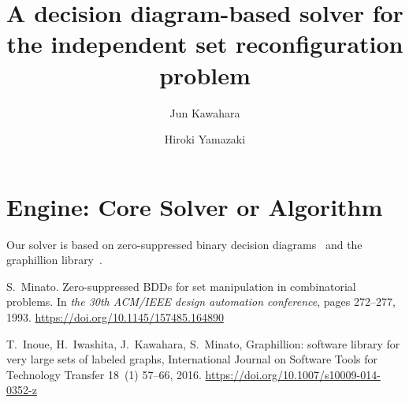 \documentclass{article}
\date{}
\title{A decision diagram-based solver for the independent set reconfiguration problem}
\author[1]{Jun Kawahara}
\author[1]{Hiroki Yamazaki}
\affil[1]{Kyoto University}
\begin{document}
\maketitle

\section{Engine: Core Solver or Algorithm}
Our solver is based on zero-suppressed binary decision diagrams~\cite{Minato93} and the graphillion library~\cite{Inoue2016}.


\begin{thebibliography}{99}
S.~Minato.
\newblock Zero-suppressed {BDD}s for set manipulation in combinatorial
  problems.
\newblock In {\em the 30th ACM/IEEE design automation conference}, pages
  272--277, 1993.
\newblock \url {https://doi.org/10.1145/157485.164890}

T.~Inoue, H.~Iwashita, J.~Kawahara, S.~Minato, Graphillion: software library
  for very large sets of labeled graphs, International Journal on Software
  Tools for Technology Transfer 18~(1) 57--66, 2016.
\newblock \url {https://doi.org/10.1007/s10009-014-0352-z}
  
\end{thebibliography}
\end{document}
